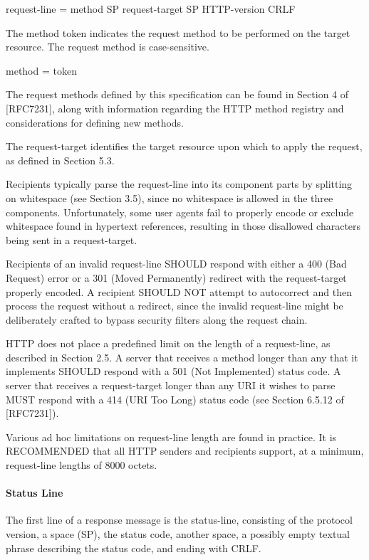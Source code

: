      request-line   = method SP request-target SP HTTP-version CRLF

   The method token indicates the request method to be performed on the
   target resource.  The request method is case-sensitive.

     method         = token

   The request methods defined by this specification can be found in
   Section 4 of [RFC7231], along with information regarding the HTTP
   method registry and considerations for defining new methods.

   The request-target identifies the target resource upon which to apply
   the request, as defined in Section 5.3.

   Recipients typically parse the request-line into its component parts
   by splitting on whitespace (see Section 3.5), since no whitespace is
   allowed in the three components.  Unfortunately, some user agents
   fail to properly encode or exclude whitespace found in hypertext
   references, resulting in those disallowed characters being sent in a
   request-target.

   Recipients of an invalid request-line SHOULD respond with either a
   400 (Bad Request) error or a 301 (Moved Permanently) redirect with
   the request-target properly encoded.  A recipient SHOULD NOT attempt
   to autocorrect and then process the request without a redirect, since
   the invalid request-line might be deliberately crafted to bypass
   security filters along the request chain.

   HTTP does not place a predefined limit on the length of a
   request-line, as described in Section 2.5.  A server that receives a
   method longer than any that it implements SHOULD respond with a 501
   (Not Implemented) status code.  A server that receives a
   request-target longer than any URI it wishes to parse MUST respond
   with a 414 (URI Too Long) status code (see Section 6.5.12 of
   [RFC7231]).

   Various ad hoc limitations on request-line length are found in
   practice.  It is RECOMMENDED that all HTTP senders and recipients
   support, at a minimum, request-line lengths of 8000 octets.
\paragraph{Status Line}
The first line of a response message is the status-line, consisting
   of the protocol version, a space (SP), the status code, another
   space, a possibly empty textual phrase describing the status code,
   and ending with CRLF.

